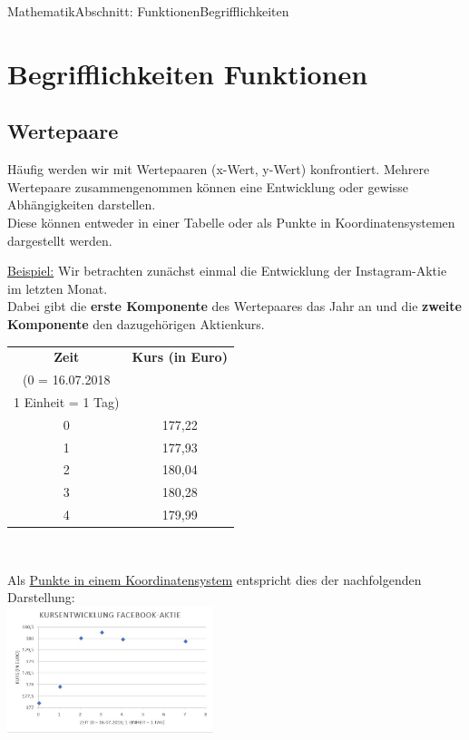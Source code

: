 \documentclass[11pt,twocolumn,oneside,openany,headings=optiontotoc,11pt,numbers=noenddot]{article}
\begin{document}
	\begin{worksheet}{Mathematik}{Abschnitt: Funktionen}{Begrifflichkeiten}
		\setcounter{section}{2}
		\setcounter{page}{10}
		\section{Begrifflichkeiten Funktionen}
		\subsection{Wertepaare} Häufig werden wir mit Wertepaaren (x-Wert, y-Wert) konfrontiert. Mehrere Wertepaare zusammengenommen können eine Entwicklung oder gewisse Abhängigkeiten darstellen.\\
		Diese können entweder in einer Tabelle oder als Punkte in Koordinatensystemen dargestellt werden.\\
		\par\bigskip\noindent
		\underline{Beispiel:} Wir betrachten zunächst einmal die Entwicklung der Instagram-Aktie im letzten Monat.\\
		Dabei gibt die \textbf{erste Komponente} des Wertepaares das Jahr an und die \textbf{zweite Komponente} den dazugehörigen Aktienkurs.\\
		\par\bigskip\noindent
		\begin{tabularx}{0.45\textwidth}{c|c}
			\textbf{Zeit} & \textbf{Kurs (in Euro)}\\
			(0 = 16.07.2018 & \\
			1 Einheit = 1 Tag) & \\
			\hline
			0 & 177,22\\
			\hline
			1 & 177,93\\
			\hline
			2 & 180,04\\
			\hline
			3 & 180,28\\
			\hline
			4 & 179,99\\
			\hline
		\end{tabularx}\\
		\par\noindent
		Als \underline{Punkte in einem Koordinatensystem} entspricht dies der nachfolgenden Darstellung:\\
		\includegraphics[width=0.45\textwidth]{../99_Bilder/fb.jpg}\\

\end{worksheet}
\end{document}
